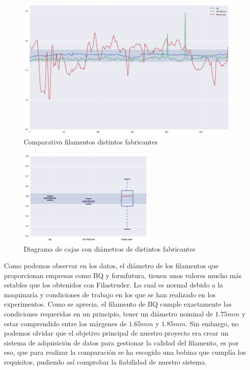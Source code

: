 \begin{figure}[H]
    \centering
    \includegraphics[width=0.99\textwidth]{images/producciones/conclusiones/output_8_1.png}
    \caption{Comparativa filamentos distintos fabricantes}
    \label{fig:concl_graf5}
\end{figure}

\begin{figure}[H]
    \centering
    \includegraphics[width=0.6\textwidth]{images/producciones/conclusiones/output_9_1.png}
    \caption{Diagrama de cajas con diámetros de distintos fabricantes}
    \label{fig:concl_cajas5}
\end{figure}

Como podemos observar en los datos, el diámetro de los filamentos que proporcionan empresas como BQ y formfutura, tienen unos valores mucho más estables que los obtenidos con Filastruder. Lo cual es normal debido a la maquinaría y condiciones de trabajo en los que se han realizado en los experimentos. Como se aprecia, el filamento de BQ cumple exactamente las condiciones requeridas en un principio, tener un diámetro nominal  de $1.75mm$ y estar comprendido entre los márgenes de $1.65mm$ y $1.85mm$. Sin embargo, no podemos olvidar que el objetivo principal de nuestro proyecto era crear un sistema de adquisición de datos para gestionar la calidad del filamento, es por eso, que para realizar la comparación se ha escogido una bobina que cumplía los requisitos, pudiendo así comprobar la fiabilidad de nuestro sistema.\\

